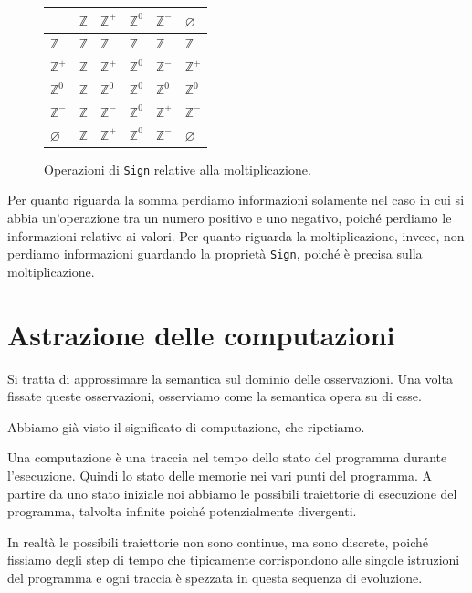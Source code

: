 \hfill
\begin{minipage}[t]{0.5\textwidth}
  \begin{figure}[H]
    \centering
    \renewcommand{\arraystretch}{2}
    \begin{tabular}{|m{2em}|m{2em}|m{2em}|m{2em}|m{2em}|m{2em}|}
        \hline
        & $\mathbb{Z}$ & $\mathbb{Z}^+$ & $\mathbb{Z}^0$ & $\mathbb{Z}^-$ & $\varnothing$ \\
        \hline
        $\mathbb{Z}$ & $\mathbb{Z}$ & $\mathbb{Z}$ & $\mathbb{Z}$ & $\mathbb{Z}$ & $\mathbb{Z}$ \\
        \hline
        $\mathbb{Z}^+$ & $\mathbb{Z}$ & $\mathbb{Z}^+$ & $\mathbb{Z}^0$ & $\mathbb{Z}^-$ & $\mathbb{Z}^+$ \\
        \hline
        $\mathbb{Z}^0$ & $\mathbb{Z}$ & $\mathbb{Z}^0$ & $\mathbb{Z}^0$ & $\mathbb{Z}^0$ & $\mathbb{Z}^0$ \\
        \hline
        $\mathbb{Z}^-$ & $\mathbb{Z}$ & $\mathbb{Z}^-$ & $\mathbb{Z}^0$ & $\mathbb{Z}^+$ & $\mathbb{Z}^-$ \\
        \hline
        $\varnothing$ & $\mathbb{Z}$ & $\mathbb{Z}^+$ & $\mathbb{Z}^0$ & $\mathbb{Z}^-$ & $\varnothing$ \\
        \hline
    \end{tabular}
    \caption{Operazioni di \texttt{Sign} relative alla moltiplicazione.}
  \end{figure}
\end{minipage}

Per quanto riguarda la somma perdiamo informazioni solamente nel caso in cui si abbia un'operazione tra 
un numero positivo e uno negativo, poiché perdiamo le informazioni relative ai valori. Per quanto riguarda la moltiplicazione, invece, non perdiamo informazioni 
guardando la proprietà \texttt{Sign}, poiché è precisa sulla moltiplicazione.
\section{Astrazione delle computazioni}
Si tratta di approssimare la semantica sul dominio delle osservazioni.
Una volta fissate queste osservazioni, osserviamo come la semantica opera su di esse.

Abbiamo già visto il significato di computazione, che ripetiamo.
\begin{tcolorbox}[title = {Computazione}]
  Una computazione è una traccia nel tempo dello stato del programma durante l'esecuzione. Quindi lo stato 
  delle memorie nei vari punti del programma.
  A partire da uno stato iniziale noi abbiamo le possibili traiettorie di esecuzione del programma, 
  talvolta infinite 
  poiché potenzialmente divergenti.
\end{tcolorbox}
In realtà le possibili traiettorie non sono continue, ma sono discrete, poiché fissiamo degli step di tempo 
che tipicamente corrispondono alle singole istruzioni del programma e ogni traccia è spezzata in questa sequenza 
di evoluzione.

